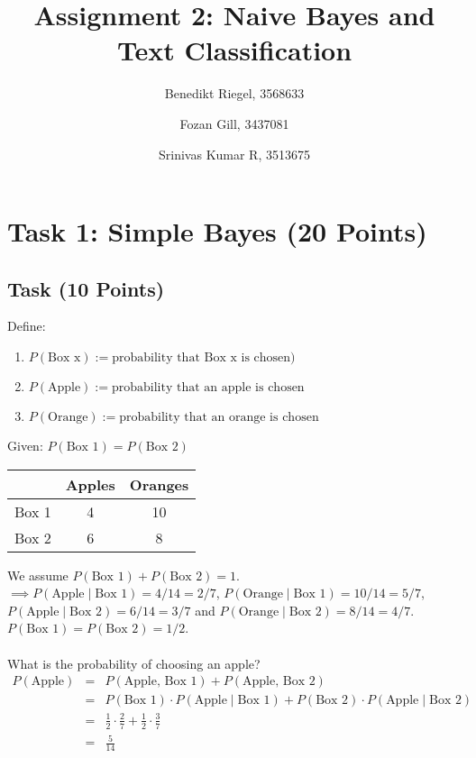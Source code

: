 \documentclass{article}
\title{Assignment 2: Naive Bayes and Text Classification}
\author{Benedikt Riegel, 3568633
    \and Fozan Gill, 3437081
    \and Srinivas Kumar R, 3513675}
\begin{document}
	\maketitle
	\section{Task 1: Simple Bayes (20 Points)}
	\subsection{Task (10 Points)}
	Define:
	\begin{enumerate}[label=-]
		\item $P(\text{Box x}) := \text{probability that Box x is chosen})$
		\item $P(\text{Apple}) := \text{probability that an apple is chosen}$
		\item $P(\text{Orange}) := \text{probability that an orange is chosen}$
	\end{enumerate}
	Given: $P(\text{Box 1}) = P(\text{Box 2})$
	\begin{center}
		\begin{tabular}{ |c|c|c| }
			\hline
			& Apples & Oranges \\
			\hline
			Box 1 & 4 & 10 \\
			\hline
			Box 2 & 6 & 8 \\
			\hline
		\end{tabular}
	\end{center}
	We assume $P(\text{Box 1}) + P(\text{Box 2}) = 1$.\\
	$\implies P(\text{Apple}\mid\text{Box 1}) = 4/14 = 2/7$, $P(\text{Orange}\mid\text{Box 1}) = 10/14 = 5/7$,\\
	$P(\text{Apple}\mid\text{Box 2}) = 6/14 = 3/7$ and $P(\text{Orange}\mid\text{Box 2}) = 8/14 = 4/7$.\\
	$P(\text{Box 1}) = P(\text{Box 2}) = 1/2$.\\\\
	What is the probability of choosing an apple?\\
	\begin{eqnarray*}
		P(\text{Apple}) &=& P(\text{Apple, Box 1}) + P(\text{Apple, Box 2})\\
		&=& P(\text{Box 1}) \cdot P(\text{Apple}\mid\text{Box 1}) + P(\text{Box 2}) \cdot P(\text{Apple}\mid\text{Box 2})\\
		&=& \frac{1}{2} \cdot \frac{2}{7} + \frac{1}{2} \cdot \frac{3}{7}\\
		&=& \frac{5}{14}
	\end{eqnarray*}
\end{document}
